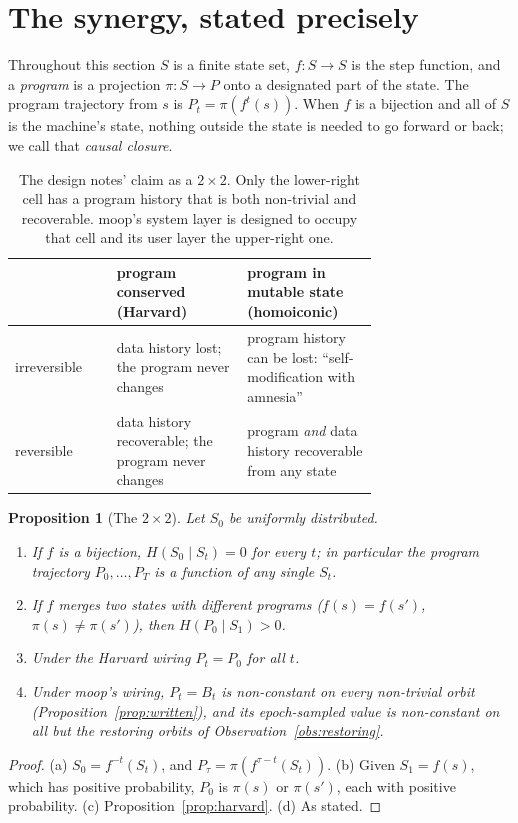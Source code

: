 \documentclass[11pt]{article}
\newtheorem{proposition}[theorem]{Proposition}
\theoremstyle{definition}
\theoremstyle{remark}
\newcommand{\moop}{\textsf{moop}}
\begin{document}
\section{The synergy, stated precisely}
\label{sec:synergy}

Throughout this section $S$ is a finite state set, $f:S\to S$ is the step
function, and a \emph{program} is a projection $\pi:S\to P$ onto a
designated part of the state. The program trajectory from $s$ is
$P_t=\pi(f^t(s))$. When $f$ is a bijection and all of $S$ is the
machine's state, nothing outside the state is needed to go forward or
back; we call that \emph{causal closure}.

\begin{table}[t]
\centering
\small
\begin{tabular}{@{}l p{0.36\linewidth} p{0.36\linewidth}@{}}
\toprule
 & program conserved (Harvard) & program in mutable state (homoiconic) \\
\midrule
irreversible & data history lost; the program never changes
  & program history can be lost: ``self-modification with amnesia'' \\
reversible & data history recoverable; the program never changes
  & program \emph{and} data history recoverable from any state \\
\bottomrule
\end{tabular}
\caption{The design notes' claim as a $2\times2$. Only the lower-right
cell has a program history that is both non-trivial and recoverable.
\moop{}'s system layer is designed to occupy that cell and its user layer
the upper-right one.}
\label{tab:twobytwo}
\end{table}

\begin{proposition}[The $2\times2$]
\label{prop:twobytwo}
Let $S_0$ be uniformly distributed.
\begin{enumerate}[nosep,label=(\alph*)]
\item If $f$ is a bijection, $H(S_0\mid S_t)=0$ for every $t$; in
  particular the program trajectory $P_0,\dots,P_T$ is a function of any
  single $S_t$.
\item If $f$ merges two states with different programs
  ($f(s)=f(s')$, $\pi(s)\ne\pi(s')$), then $H(P_0\mid S_1)>0$.
\item Under the Harvard wiring $P_t=P_0$ for all $t$.
\item Under \moop{}'s wiring, $P_t=B_t$ is non-constant on every
  non-trivial orbit (Proposition~\ref{prop:written}), and its
  epoch-sampled value is non-constant on all but the restoring orbits of
  Observation~\ref{obs:restoring}.
\end{enumerate}
\end{proposition}
\begin{proof}
(a) $S_0=f^{-t}(S_t)$, and $P_\tau=\pi(f^{\tau-t}(S_t))$. (b) Given
$S_1=f(s)$, which has positive probability, $P_0$ is $\pi(s)$ or
$\pi(s')$, each with positive probability. (c) Proposition~\ref{prop:harvard}.
(d) As stated.
\end{proof}
\end{document}
